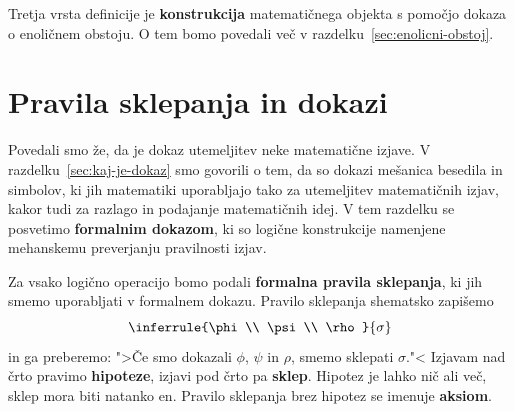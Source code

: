 Tretja vrsta definicije je \textbf{konstrukcija} matematičnega objekta s
pomočjo dokaza o enoličnem obstoju. O tem bomo povedali več v
razdelku~\ref{sec:enolicni-obstoj}.

\section{Pravila sklepanja in dokazi}
\label{sec:pravila-sklepanja-in-dokazi}


Povedali smo že, da je dokaz utemeljitev neke matematične izjave. V
razdelku~\ref{sec:kaj-je-dokaz} smo govorili o tem, da so dokazi
mešanica besedila in simbolov, ki jih matematiki uporabljajo tako za
utemeljitev matematičnih izjav, kakor tudi za razlago in podajanje
matematičnih idej. V tem razdelku se posvetimo \textbf{formalnim
  dokazom}, ki so logične konstrukcije namenjene mehanskemu
preverjanju pravilnosti izjav.

Za vsako logično operacijo bomo podali \textbf{formalna pravila
  sklepanja}, ki jih smemo uporabljati v formalnem dokazu. Pravilo
sklepanja shematsko zapišemo
%
\begin{equation*}
  \inferrule{\phi \\ \psi \\ \rho}{\sigma}
\end{equation*}
%
in ga preberemo: ">Če smo dokazali $\phi$, $\psi$ in $\rho$, smemo
sklepati $\sigma$."< Izjavam nad črto pravimo \textbf{hipoteze}, izjavi
pod črto pa \textbf{sklep}. Hipotez je lahko nič ali več, sklep mora
biti natanko en. Pravilo sklepanja brez hipotez se imenuje
\textbf{aksiom}.

